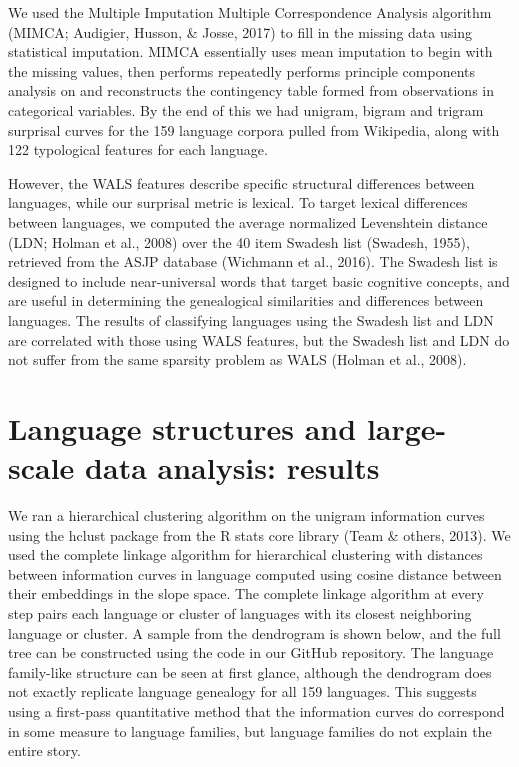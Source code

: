 \documentclass[11pt,]{article}
\begin{document}
We used the Multiple Imputation Multiple Correspondence Analysis algorithm (MIMCA; Audigier, Husson, \& Josse, 2017) to fill in the missing data using statistical imputation. MIMCA essentially uses mean imputation to begin with the missing values, then performs repeatedly performs principle components analysis on and reconstructs the contingency table formed from observations in categorical variables. By the end of this we had unigram, bigram and trigram surprisal curves for the 159 language corpora pulled from Wikipedia, along with 122 typological features for each language.

However, the WALS features describe specific structural differences between languages, while our surprisal metric is lexical. To target lexical differences between languages, we computed the average normalized Levenshtein distance (LDN; Holman et al., 2008) over the 40 item Swadesh list (Swadesh, 1955), retrieved from the ASJP database (Wichmann et al., 2016). The Swadesh list is designed to include near-universal words that target basic cognitive concepts, and are useful in determining the genealogical similarities and differences between languages. The results of classifying languages using the Swadesh list and LDN are correlated with those using WALS features, but the Swadesh list and LDN do not suffer from the same sparsity problem as WALS (Holman et al., 2008).

\hypertarget{language-structures-and-large-scale-data-analysis-results}{%
\section{Language structures and large-scale data analysis: results}\label{language-structures-and-large-scale-data-analysis-results}}

We ran a hierarchical clustering algorithm on the unigram information curves using the hclust package from the R stats core library (Team \& others, 2013). We used the complete linkage algorithm for hierarchical clustering with distances between information curves in language computed using cosine distance between their embeddings in the slope space. The complete linkage algorithm at every step pairs each language or cluster of languages with its closest neighboring language or cluster. A sample from the dendrogram is shown below, and the full tree can be constructed using the code in our GitHub repository. The language family-like structure can be seen at first glance, although the dendrogram does not exactly replicate language genealogy for all 159 languages. This suggests using a first-pass quantitative method that the information curves do correspond in some measure to language families, but language families do not explain the entire story.
\end{document}
